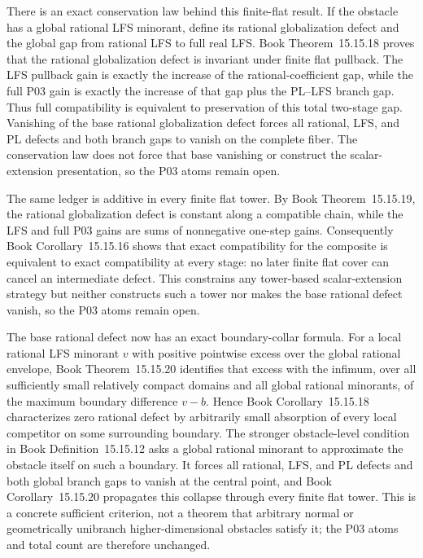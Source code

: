 \documentclass[11pt,a4paper]{article}
\theoremstyle{definition}
\theoremstyle{remark}
\begin{document}
There is an exact conservation law behind this finite-flat result.  If the
obstacle has a global rational LFS minorant, define its rational
globalization defect and the global gap from rational LFS to full real LFS.
Book Theorem~15.15.18 proves that the rational
globalization defect is invariant under finite flat pullback.  The LFS
pullback gain is exactly the increase of the rational-coefficient gap, while
the full P03 gain is exactly the increase of that gap plus the PL--LFS branch
gap.  Thus full compatibility is equivalent to preservation of this total
two-stage gap.  Vanishing of the base rational globalization defect forces
all rational, LFS, and PL defects and both branch gaps to vanish on the
complete fiber.  The conservation law does not force that base vanishing or
construct the scalar-extension presentation, so the P03 atoms remain open.

The same ledger is additive in every finite flat tower.  By
Book Theorem~15.15.19, the rational
globalization defect is constant along a compatible chain, while the LFS and
full P03 gains are sums of nonnegative one-step gains.  Consequently
Book Corollary~15.15.16 shows that exact
compatibility for the composite is equivalent to exact compatibility at
every stage: no later finite flat cover can cancel an intermediate defect.
This constrains any tower-based scalar-extension strategy but neither
constructs such a tower nor makes the base rational defect vanish, so the P03
atoms remain open.

The base rational defect now has an exact boundary-collar formula.
For a local rational LFS minorant \(v\) with positive pointwise excess over
the global rational envelope,
Book Theorem~15.15.20 identifies that excess with the
infimum, over all sufficiently small relatively compact domains and all
global rational minorants, of the maximum boundary difference \(v-b\).
Hence Book Corollary~15.15.18 characterizes zero rational
defect by arbitrarily small absorption of every local competitor on some
surrounding boundary.  The stronger obstacle-level condition in
Book Definition~15.15.12 asks a global rational minorant
to approximate the obstacle itself on such a boundary.  It forces all
rational, LFS, and PL defects and both global branch gaps to vanish at the
central point, and
Book Corollary~15.15.20 propagates this
collapse through every finite flat tower.  This is a concrete sufficient
criterion, not a theorem that arbitrary normal or geometrically unibranch
higher-dimensional obstacles satisfy it; the P03 atoms and total count are
therefore unchanged.
\end{document}
